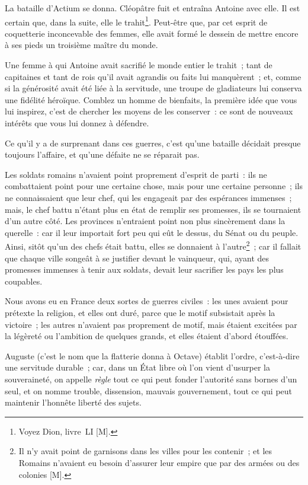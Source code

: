 \documentclass[french,twoside]{book} %
\begin{document}
La bataille d’Actium se donna. Cléopâtre fuit et entraîna Antoine avec elle. Il est certain que, dans la suite, elle le trahit\footnote{Voyez Dion, livre LI [M].}. Peut-être que, par cet esprit de coquetterie inconcevable des femmes, elle avait formé le dessein de mettre encore à ses pieds un troisième maître du monde.\par
Une femme à qui Antoine avait sacrifié le monde entier le trahit ; tant de capitaines et tant de rois qu’il avait agrandis ou faits lui manquèrent ; et, comme si la générosité avait été liée à la servitude, une troupe de gladiateurs lui conserva une fidélité héroïque. Comblez un homme de bienfaits, la première idée que vous lui inspirez, c’est de chercher les moyens de les conserver : ce sont de nouveaux intérêts que vous lui donnez à défendre.\par
Ce qu’il y a de surprenant dans ces guerres, c’est qu’une bataille décidait presque toujours l’affaire, et qu’une défaite ne se réparait pas.\par
Les soldats romains n’avaient point proprement d’esprit de parti : ils ne combattaient point pour une certaine chose, mais pour une certaine personne ; ils ne connaissaient que leur chef, qui les engageait par des espérances immenses ; mais, le chef battu n’étant plus en état de remplir ses promesses, ils se tournaient d’un autre côté. Les provinces n’entraient point non plus sincèrement dans la querelle : car il leur importait fort peu qui eût le dessus, du Sénat ou du peuple. Ainsi, sitôt qu’un des chefs était battu, elles se donnaient à l’autre\footnote{Il n’y avait point de garnisons dans les villes pour les contenir ; et les Romains n’avaient eu besoin d’assurer leur empire que par des armées ou des colonies [M].} ; car il fallait que chaque ville songeât à se justifier devant le vainqueur, qui, ayant des promesses immenses à tenir aux soldats, devait leur sacrifier les pays les plus coupables.\par
Nous avons eu en France deux sortes de guerres civiles : les unes avaient pour prétexte la religion, et elles ont duré, parce que le motif subsistait après la victoire ; les autres n’avaient pas proprement de motif, mais étaient excitées par la légèreté ou l’ambition de quelques grands, et elles étaient d’abord étouffées.\par
Auguste (c’est le nom que la flatterie donna à Octave) établit l’ordre, c’est-à-dire une servitude durable ; car, dans un État libre où l’on vient d’usurper la souveraineté, on appelle {\itshape règle} tout ce qui peut fonder l’autorité sans bornes d’un seul, et on nomme trouble, dissension, mauvais gouvernement, tout ce qui peut maintenir l’honnête liberté des sujets.\par
\end{document}
